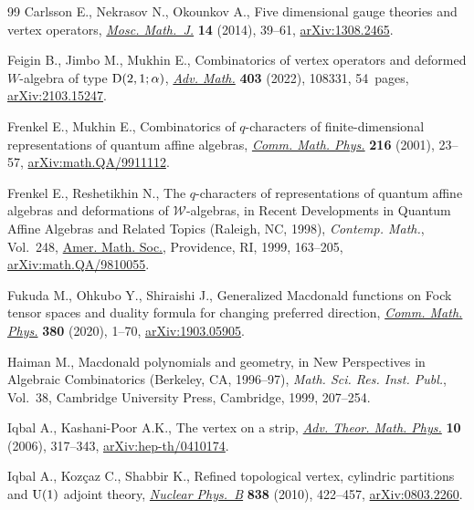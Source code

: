 \begin{thebibliography}{99}
Carlsson E., Nekrasov N., Okounkov A., Five dimensional gauge theories and
 vertex operators, \href{https://doi.org/10.17323/1609-4514-2014-14-1-39-61}{\textit{Mosc. Math.~J.}} \textbf{14} (2014), 39--61,
 \href{https://arxiv.org/abs/1308.2465}{arXiv:1308.2465}.

Feigin B., Jimbo M., Mukhin E., Combinatorics of vertex operators and deformed
 $W$-algebra of type {${\rm D}(2, 1; \alpha)$}, \href{https://doi.org/10.1016/j.aim.2022.108331}{\textit{Adv. Math.}}
 \textbf{403} (2022), 108331, 54~pages, \href{https://arxiv.org/abs/2103.15247}{arXiv:2103.15247}.

Frenkel E., Mukhin E., Combinatorics of $q$-characters of finite-dimensional
 representations of quantum affine algebras, \href{https://doi.org/10.1007/s002200000323}{\textit{Comm. Math. Phys.}}
 \textbf{216} (2001), 23--57, \href{https://arxiv.org/abs/math.QA/9911112}{arXiv:math.QA/9911112}.

Frenkel E., Reshetikhin N., The {$q$}-characters of representations of quantum
 affine algebras and deformations of {$\mathcal W$}-algebras, in Recent
 Developments in Quantum Affine Algebras and Related Topics ({R}aleigh, {NC},
 1998), \textit{Contemp. Math.}, Vol.~248, \href{https://doi.org/10.1090/conm/248/03823}{Amer. Math. Soc.}, Providence, RI,
 1999, 163--205, \href{https://arxiv.org/abs/math.QA/9810055}{arXiv:math.QA/9810055}.

Fukuda M., Ohkubo Y., Shiraishi J., Generalized {M}acdonald functions on {F}ock
 tensor spaces and duality formula for changing preferred direction,
 \href{https://doi.org/10.1007/s00220-020-03872-4}{\textit{Comm. Math. Phys.}} \textbf{380} (2020), 1--70, \href{https://arxiv.org/abs/1903.05905}{arXiv:1903.05905}.

Haiman M., Macdonald polynomials and geometry, in New Perspectives in Algebraic
 Combinatorics ({B}erkeley, {CA}, 1996--97), \textit{Math. Sci. Res. Inst.
 Publ.}, Vol.~38, Cambridge University Press, Cambridge, 1999, 207--254.

Iqbal A., Kashani-Poor A.K., The vertex on a strip, \href{https://dx.doi.org/10.4310/ATMP.2006.v10.n3.a2}{\textit{Adv. Theor. Math.
 Phys.}} \textbf{10} (2006), 317--343, \href{https://arxiv.org/abs/hep-th/0410174}{arXiv:hep-th/0410174}.

Iqbal A., Koz\c{c}az C., Shabbir K., Refined topological vertex, cylindric
 partitions and {$\rm U(1)$} adjoint theory, \href{https://doi.org/10.1016/j.nuclphysb.2010.06.010}{\textit{Nuclear Phys.~B}}
 \textbf{838} (2010), 422--457, \href{https://arxiv.org/abs/0803.2260}{arXiv:0803.2260}.


\end{thebibliography}
